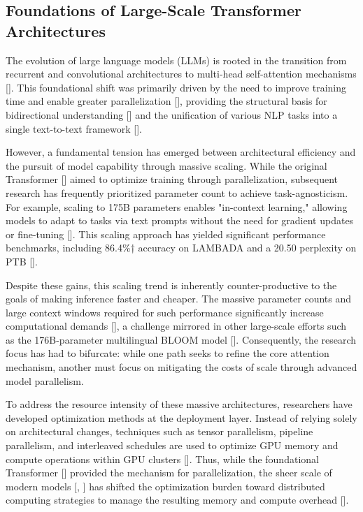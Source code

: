 \documentclass[11pt]{article}
\begin{document}
\subsection{Foundations of Large-Scale Transformer Architectures}

The evolution of large language models (LLMs) is rooted in the transition from recurrent and convolutional architectures to multi-head self-attention mechanisms [\citep{1706.03762}]. This foundational shift was primarily driven by the need to improve training time and enable greater parallelization [\citep{1706.03762}], providing the structural basis for bidirectional understanding [\citep{1810.04805}] and the unification of various NLP tasks into a single text-to-text framework [\citep{1910.10683}].

However, a fundamental tension has emerged between architectural efficiency and the pursuit of model capability through massive scaling. While the original Transformer [\citep{1706.03762}] aimed to optimize training through parallelization, subsequent research has frequently prioritized parameter count to achieve task-agnosticism. For example, scaling to 175B parameters enables "in-context learning," allowing models to adapt to tasks via text prompts without the need for gradient updates or fine-tuning [\citep{2005.14165}]. This scaling approach has yielded significant performance benchmarks, including 86.4\%† accuracy on LAMBADA and a 20.50 perplexity on PTB [\citep{2005.14165}].

Despite these gains, this scaling trend is inherently counter-productive to the goals of making inference faster and cheaper. The massive parameter counts and large context windows required for such performance significantly increase computational demands [\citep{2005.14165}], a challenge mirrored in other large-scale efforts such as the 176B-parameter multilingual BLOOM model [\citep{2211.05100}]. Consequently, the research focus has had to bifurcate: while one path seeks to refine the core attention mechanism, another must focus on mitigating the costs of scale through advanced model parallelism.

To address the resource intensity of these massive architectures, researchers have developed optimization methods at the deployment layer. Instead of relying solely on architectural changes, techniques such as tensor parallelism, pipeline parallelism, and interleaved schedules are used to optimize GPU memory and compute operations within GPU clusters [\citep{2104.04473}]. Thus, while the foundational Transformer [\citep{1706.03762}] provided the mechanism for parallelization, the sheer scale of modern models [\citep{2005.14165}, \citep{2211.05100}] has shifted the optimization burden toward distributed computing strategies to manage the resulting memory and compute overhead [\citep{2104.04473}].
\end{document}
